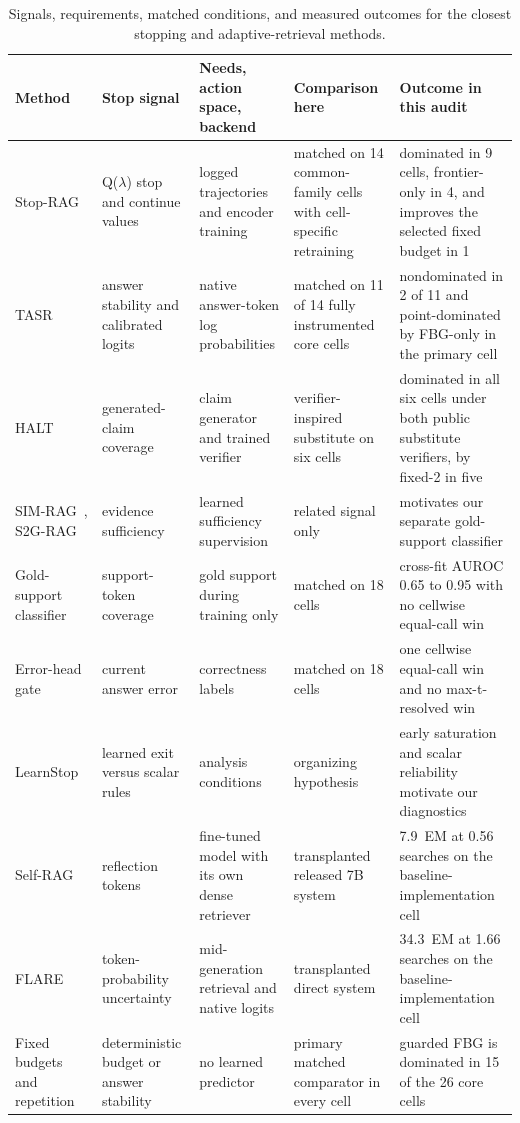 \documentclass[manuscript,nonacm]{acmart}
\begin{document}
\begin{table}[htbp]
\caption{Signals, requirements, matched conditions, and measured outcomes for
the closest stopping and adaptive-retrieval methods.}
\label{tab:supp-related}
\small
\setlength{\tabcolsep}{4pt}
\begin{tabular}{p{1.9cm}p{2.1cm}p{2.6cm}p{2.9cm}p{3.9cm}}
\toprule
Method & Stop signal & Needs, action space, backend & Comparison here & Outcome in this audit \\
\midrule
Stop-RAG~\cite{park2025stoprag} & Q($\lambda$) stop and continue values & logged trajectories and encoder training & matched on 14 common-family cells with cell-specific retraining & dominated in 9 cells, frontier-only in 4, and improves the selected fixed budget in 1 \\
TASR~\cite{kieback2026tasr} & answer stability and calibrated logits & native answer-token log probabilities & matched on 11 of 14 fully instrumented core cells & nondominated in 2 of 11 and point-dominated by FBG-only in the primary cell \\
HALT~\cite{roh2026halt} & generated-claim coverage & claim generator and trained verifier & verifier-inspired substitute on six cells & dominated in all six cells under both public substitute verifiers, by fixed-2 in five \\
SIM-RAG~\cite{yang2025simrag}, S2G-RAG~\cite{li2026s2grag} & evidence sufficiency & learned sufficiency supervision & related signal only & motivates our separate gold-support classifier \\
Gold-support classifier & support-token coverage & gold support during training only & matched on 18 cells & cross-fit AUROC 0.65 to 0.95 with no cellwise equal-call win \\
Error-head gate & current answer error & correctness labels & matched on 18 cells & one cellwise equal-call win and no max-t-resolved win \\
LearnStop~\cite{dong2026learnstop} & learned exit versus scalar rules & analysis conditions & organizing hypothesis & early saturation and scalar reliability motivate our diagnostics \\
Self-RAG~\cite{asai2024selfrag} & reflection tokens & fine-tuned model with its own dense retriever & transplanted released 7B system & 7.9~EM at 0.56 searches on the baseline-implementation cell \\
FLARE~\cite{jiang2023flare} & token-probability uncertainty & mid-generation retrieval and native logits & transplanted direct system & 34.3~EM at 1.66 searches on the baseline-implementation cell \\
Fixed budgets and repetition & deterministic budget or answer stability & no learned predictor & primary matched comparator in every cell & guarded FBG is dominated in 15 of the 26 core cells \\
\bottomrule
\end{tabular}
\end{table}
\end{document}
